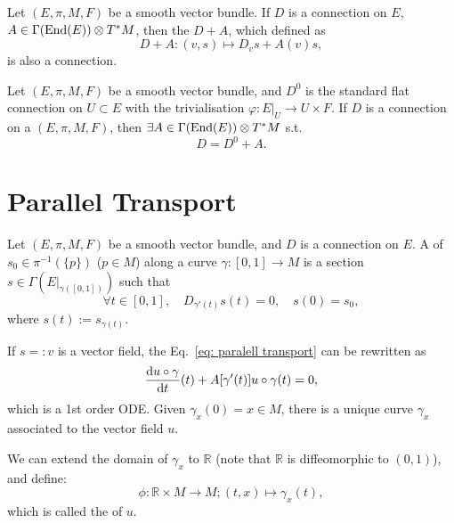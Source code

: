 \documentclass[openany, oneside, a5paper]{book}
\begin{document}
\begin{theorem}
    Let $(E, \pi, M, F)$ be a smooth vector bundle.
    If $D$ is a connection on $E$, $A \in \Gamma(\operatorname{End}(E)) \otimes T^*M$, then
    the $D + A$, which defined as
    \begin{equation}
        D + A \colon (v, s)  \mapsto D_v s + A(v) s,
    \end{equation}
    is also a connection.
\end{theorem}

\begin{theorem}
    Let $(E, \pi, M, F)$ be a smooth vector bundle, and $D^0$ is the standard flat connection on $U \subset E$ with the trivialisation $\varphi \colon E|_U \to U \times F$.
    If $D$ is a connection on a $(E, \pi, M, F)$,
    then $\exists A \in \Gamma(\operatorname{End}(E)) \otimes T^*M$ s.t.\ 
    \begin{equation}
        D = D^0 + A.
    \end{equation}
\end{theorem}

\section{Parallel Transport}

\begin{definition}
    Let $(E, \pi, M, F)$ be a smooth vector bundle, and $D$ is a connection on $E$.
    A \indexbf{paralell transport} of $s_0 \in \pi^{-1}(\{p\})$ ($p \in M$) along a curve $\gamma \colon [0, 1] \to M$ is a section $s \in \Gamma(E|_{\gamma([0, 1])})$ such that
    \begin{equation}\label{eq: paralell transport}
        \forall t \in [0, 1], 
        \quad 
        D_{\gamma'(t)} s(t) = 0,
        \quad
        s(0) = s_0,
    \end{equation}
    where $s(t) := s_{\gamma(t)}$.
\end{definition}

If $s =:v$ is a vector field, the Eq.~\eqref{eq: paralell transport} can be rewritten as
\begin{equation}
    \diff {u \circ \gamma} {t} (t) + A[\gamma'(t)] u \circ \gamma(t) = 0,
\end{equation}
which is a 1st order ODE.
Given $\gamma_x(0) = x \in M$, there is a unique curve $\gamma_x$ associated to the vector field $u$.

We can extend the domain of $\gamma_x$ to $\mathbb R$ (note that $\mathbb R$ is diffeomorphic to $(0, 1)$), and define:
\begin{equation}
    \phi \colon \mathbb R \times M \to M; (t, x) \mapsto \gamma_x(t),
\end{equation}
which is called the  of $u$.  %
\end{document}

